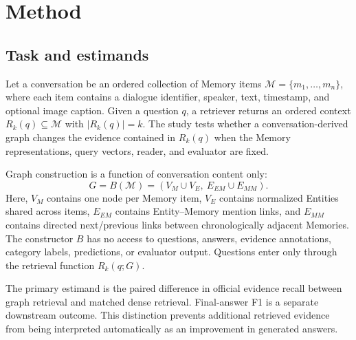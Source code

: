\documentclass[10pt,twocolumn]{article}
\begin{document}
\section{Method}

\subsection{Task and estimands}

Let a conversation be an ordered collection of Memory items
\(\mathcal{M}=\{m_1,\ldots,m_n\}\), where each item contains a dialogue
identifier, speaker, text, timestamp, and optional image caption. Given a
question \(q\), a retriever returns an ordered context
\(R_k(q)\subseteq\mathcal{M}\) with \(|R_k(q)|=k\). The study tests whether a
conversation-derived graph changes the evidence contained in \(R_k(q)\) when
the Memory representations, query vectors, reader, and evaluator are fixed.

Graph construction is a function of conversation content only:
\begin{equation}
G=B(\mathcal{M})=(V_M\cup V_E,\ E_{EM}\cup E_{MM}).
\label{eq:graph}
\end{equation}
Here, \(V_M\) contains one node per Memory item, \(V_E\) contains normalized
Entities shared across items, \(E_{EM}\) contains Entity--Memory mention
links, and \(E_{MM}\) contains directed next/previous links between
chronologically adjacent Memories. The constructor \(B\) has no access to
questions, answers, evidence annotations, category labels, predictions, or
evaluator output. Questions enter only through the retrieval function
\(R_k(q;G)\).

The primary estimand is the paired difference in official evidence recall
between graph retrieval and matched dense retrieval. Final-answer F1 is a
separate downstream outcome. This distinction prevents additional retrieved
evidence from being interpreted automatically as an improvement in generated
answers.
\end{document}

